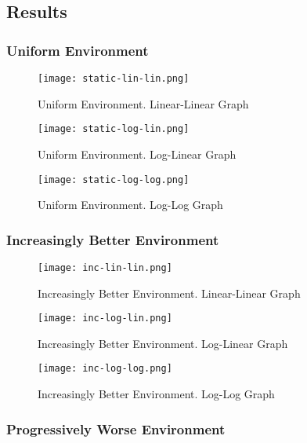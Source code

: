\subsection{Results}

\subsubsection{Uniform Environment}
\begin{figure}[ht]
    \centering
    \texttt{[image: static-lin-lin.png]}
    \caption{Uniform Environment. Linear-Linear Graph}
    \label{fig:fn}
\end{figure}

\begin{figure}[ht]
    \centering
    \texttt{[image: static-log-lin.png]}
    \caption{Uniform Environment. Log-Linear Graph}
    \label{fig:fn}
\end{figure}

\begin{figure}[ht]
    \centering
    \texttt{[image: static-log-log.png]}
    \caption{Uniform Environment. Log-Log Graph}
    \label{fig:fn}
\end{figure}


\subsubsection{Increasingly Better Environment}

\begin{figure}[ht]
    \centering
    \texttt{[image: inc-lin-lin.png]}
    \caption{Increasingly Better Environment. Linear-Linear Graph}
    \label{fig:fn}
\end{figure}

\begin{figure}[ht]
    \centering
    \texttt{[image: inc-log-lin.png]}
    \caption{Increasingly Better Environment. Log-Linear Graph}
    \label{fig:fn}
\end{figure}

\begin{figure}[ht]
    \centering
    \texttt{[image: inc-log-log.png]}
    \caption{Increasingly Better Environment. Log-Log Graph}
    \label{fig:fn}
\end{figure}

\subsubsection{Progressively Worse Environment}

